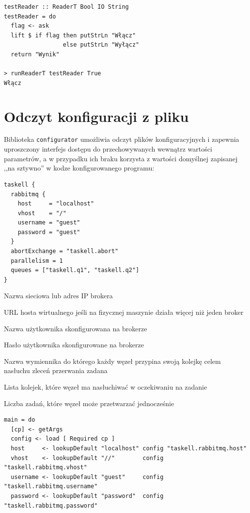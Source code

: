 \begin{lstlisting}
testReader :: ReaderT Bool IO String
testReader = do
  flag <- ask 
  lift $ if flag then putStrLn "Włącz"
                 else putStrLn "Wyłącz"
  return "Wynik"

> runReaderT testReader True
Włącz
\end{lstlisting}

\newpage
\section{Odczyt konfiguracji z pliku}
Biblioteka \texttt{configurator}\cite{Conf} umożliwia odczyt plików konfiguracyjnych i zapewnia uproszczony interfejs dostępu do przechowywanych wewnątrz wartości parametrów, a w przypadku ich braku korzysta z wartości domyślnej zapisanej ,,na sztywno'' w kodze konfigurowanego programu:
\begin{lstlisting}[caption=Przykładowy plik konfiguracyjny]
taskell {
  rabbitmq {
    host     = "localhost"
    vhost    = "/"
    username = "guest"
    password = "guest"
  }
  abortExchange = "taskell.abort"
  parallelism = 1
  queues = ["taskell.q1", "taskell.q2"]
}
\end{lstlisting}

\begin{description}[align=right,labelwidth=10cm,leftmargin=6cm]
  \item[taskell.rabbitmq.host] Nazwa sieciowa lub adres IP brokera
  \item[taskell.rabbitmq.vhost] URL hosta wirtualnego jeśli na fizycznej maszynie działa więcej niż jeden broker
  \item[taskell.rabbitmq.username] Nazwa użytkownika skonfigurowana na brokerze
  \item[taskell.rabbitmq.password] Hasło użytkownika skonfigurowane na brokerze
  \item[taskell.abortExchange] Nazwa wymiennika do którego każdy węzeł przypina swoją kolejkę celem nasłuchu zleceń przerwania zadana
  \item[taskell.queues] Lista kolejek, które węzeł ma nasłuchiwać w oczekiwaniu na zadanie
  \item[taskell.parallelism] Liczba zadań, które węzeł może przetwarzać jednocześnie
\end{description}
\begin{lstlisting}[caption=Odczyt konfiguracji]
main = do
  [cp] <- getArgs
  config <- load [ Required cp ]
  host     <- lookupDefault "localhost" config "taskell.rabbitmq.host"
  vhost    <- lookupDefault "//"        config "taskell.rabbitmq.vhost"
  username <- lookupDefault "guest"     config "taskell.rabbitmq.username"
  password <- lookupDefault "password"  config "taskell.rabbitmq.password"
\end{lstlisting}
\newpage
